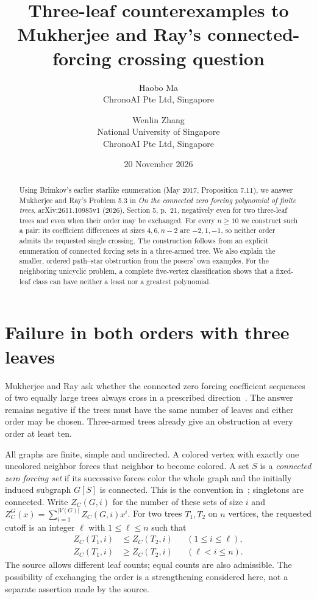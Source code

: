 \documentclass[11pt]{article}
\title{Three-leaf counterexamples to Mukherjee and Ray's connected-forcing crossing question}
\author{Haobo Ma\\\small ChronoAI Pte Ltd, Singapore
\and Wenlin Zhang\\\small National University of Singapore\\\small ChronoAI Pte Ltd, Singapore}
\date{20 November 2026}
\newcommand{\ZC}{Z_C}
\begin{document}
\maketitle
\begin{abstract}
\begin{sloppypar}
Using Brimkov's earlier starlike enumeration (May 2017, Proposition 7.11),
we answer Mukherjee and Ray's Problem 5.3 in \emph{On the connected zero forcing polynomial of finite
trees}, arXiv:2611.10985v1 (2026), Section 5, p.~21, negatively even for
two three-leaf trees and even when their order may be exchanged.
For every $n\geq10$ we construct such a pair: its coefficient differences
at sizes $4,6,n-2$ are $-2,1,-1$, so neither order admits the requested
single crossing. The construction follows from an explicit enumeration
of connected forcing sets in a three-armed tree. We also explain the
smaller, ordered path--star obstruction from the posers' own examples.
For the neighboring unicyclic problem, a complete five-vertex classification
shows that a fixed-leaf class can have neither a least nor a greatest polynomial.
\end{sloppypar}
\end{abstract}

\section{Failure in both orders with three leaves}
Mukherjee and Ray ask whether the connected zero forcing coefficient
sequences of two equally large trees always cross in a prescribed
direction~\cite[Problem 5.3]{MR}. The answer remains negative if the trees
must have the same number of leaves and either order may be chosen.
Three-armed trees already give an obstruction at every order at least ten.

All graphs are finite, simple and undirected. A colored vertex with exactly
one uncolored neighbor forces that neighbor to become colored. A set $S$
is a \emph{connected zero forcing set} if its successive forces color the
whole graph and the initially induced subgraph $G[S]$ is connected.
This is the convention in~\cite{BD}; singletons are connected.
Write $\ZC(G,i)$ for the number of these sets of size $i$ and
$\ZC^G(x)=\sum_{i=1}^{|V(G)|}\ZC(G,i)x^i$.
For two trees $T_1,T_2$ on $n$ vertices, the requested cutoff is an integer
$\ell$ with $1\leq\ell\leq n$ such that
\begin{align}
\ZC(T_1,i)&\leq\ZC(T_2,i) &&(1\leq i\leq\ell),\label{eq:low}\\
\ZC(T_1,i)&\geq\ZC(T_2,i) &&(\ell<i\leq n).\label{eq:high}
\end{align}
The source allows different leaf counts; equal counts are also admissible.
The possibility of exchanging the order is a strengthening considered here,
not a separate assertion made by the source.
\end{document}
